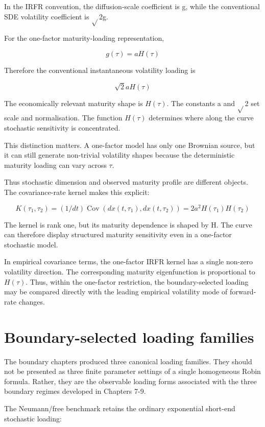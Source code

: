 \documentclass[11pt,oneside]{book}
\begin{document}
In the IRFR convention, the diffusion-scale coefficient is g, while the
conventional SDE volatility coefficient is $\sqrt{}$2g.

For the one-factor maturity-loading representation,

\[
g(\tau)=aH(\tau)
\]

Therefore the conventional instantaneous volatility loading is

\[
\sqrt{2}aH(\tau)
\]

The economically relevant maturity shape is $H(\tau)$. The constants a and $\sqrt{}$2
set scale and normalisation. The function $H(\tau)$ determines where along
the curve stochastic sensitivity is concentrated.

This distinction matters. A one-factor model has only one Brownian
source, but it can still generate non-trivial volatility shapes because
the deterministic maturity loading can vary across $\tau$.

Thus stochastic dimension and observed maturity profile are different
objects. The covariance-rate kernel makes this explicit:

\[
K(\tau_1,\tau_2) = (1/dt) \operatorname{Cov}(dx(t,\tau_1), dx(t,\tau_2)) = 2a^2 H(\tau_1)H(\tau_2)
\]

The kernel is rank one, but its maturity dependence is shaped by H. The
curve can therefore display structured maturity sensitivity even in a
one-factor stochastic model.

In empirical covariance terms, the one-factor IRFR kernel has a single
non-zero volatility direction. The corresponding maturity eigenfunction
is proportional to $H(\tau)$. Thus, within the one-factor restriction, the
boundary-selected loading may be compared directly with the leading
empirical volatility mode of forward-rate changes.

\section{Boundary-selected loading
families}\label{boundary-selected-loading-families}

The boundary chapters produced three canonical loading families. They
should not be presented as three finite parameter settings of a single
homogeneous Robin formula. Rather, they are the observable loading forms
associated with the three boundary regimes developed in Chapters 7-9.

The Neumann/free benchmark retains the ordinary exponential short-end
stochastic loading:
\end{document}
